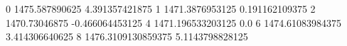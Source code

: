0 1475.587890625 4.391357421875
1 1471.3876953125 0.191162109375
2 1470.73046875 -0.466064453125
4 1471.196533203125 0.0
6 1474.61083984375 3.414306640625
8 1476.3109130859375 5.1143798828125
